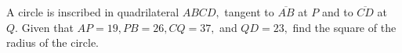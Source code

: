 A circle is inscribed in quadrilateral $ABCD,$ tangent to $\overline{AB}$ at $P$ and to $\overline{CD}$ at $Q.$  Given that $AP=19, PB=26, CQ=37,$ and $QD=23,$ find the square of the radius of the circle.